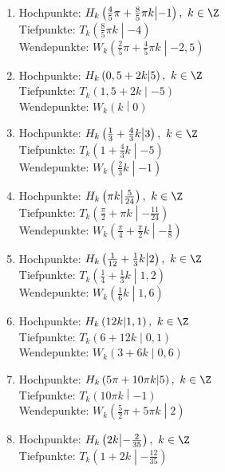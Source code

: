 \begin{Answer}[ref=sincosExtremWendeA1]
\begin{enumerate}[label=\alph*)]
		\item Hochpunkte: \(H_k\left(\frac{4}{5}\pi+\frac{8}{5}\pi k \middle\vert-1 \right),\ k\in\Z\)\\
		Tiefpunkte: \(T_k\left(\frac{8}{5}\pi k \middle\vert-4 \right)\)\\
		Wendepunkte: \(W_k\left(\frac{2}{5}\pi+\frac{4}{5}\pi k \middle\vert-2,5 \right)\)
		\item Hochpunkte: \(H_k\left(0,5+2k \middle\vert5 \right),\ k\in\Z\)\\
		Tiefpunkte: \(T_k\left(1,5+2k \middle\vert-5 \right)\)\\
		Wendepunkte: \(W_k\left(k \middle\vert0 \right)\)
		\item Hochpunkte: \(H_k\left(\frac{1}{3}+\frac{4}{3}k \middle\vert 3\right),\ k\in\Z\)\\
		Tiefpunkte: \(T_k\left(1+\frac{4}{3}k \middle\vert -5\right)\)\\
		Wendepunkte: \(W_k\left(\frac{2}{3}k \middle\vert -1\right)\)
		\item Hochpunkte: \(H_k\left(\pi k \middle\vert\frac{5}{24} \right),\ k\in\Z\)\\
		Tiefpunkte: \(T_k\left(\frac{\pi}{2}+\pi k \middle\vert-\frac{11}{24} \right)\)\\
		Wendepunkte: \(W_k\left(\frac{\pi}{4}+\frac{\pi}{2}k \middle\vert-\frac{1}{8} \right)\)
		\item Hochpunkte: \(H_k\left(\frac{1}{12}+\frac{1}{3}k \middle\vert2 \right),\ k\in\Z\)\\
		Tiefpunkte: \(T_k\left(\frac{1}{4}+\frac{1}{3}k \middle\vert1,2 \right)\)\\
		Wendepunkte: \(W_k\left(\frac{1}{6}k \middle\vert1,6 \right)\)
		\item Hochpunkte: \(H_k\left(12k \middle\vert1,1 \right),\ k\in\Z\)\\
		Tiefpunkte: \(T_k\left(6+12k \middle\vert0,1 \right)\)\\
		Wendepunkte: \(W_k\left(3+6k \middle\vert0,6 \right)\)
		\item Hochpunkte: \(H_k\left(5\pi+10\pi k \middle\vert5 \right),\ k\in\Z\)\\
		Tiefpunkte: \(T_k\left(10\pi k \middle\vert-1 \right)\)\\
		Wendepunkte: \(W_k\left(\frac{5}{2}\pi+5\pi k \middle\vert2 \right)\)
		\item Hochpunkte: \(H_k\left(2k \middle\vert-\frac{2}{35} \right),\ k\in\Z\)\\
		Tiefpunkte: \(T_k\left(1+2k \middle\vert-\frac{12}{35} \right)\)\\

\end{enumerate}
\end{Answer}

